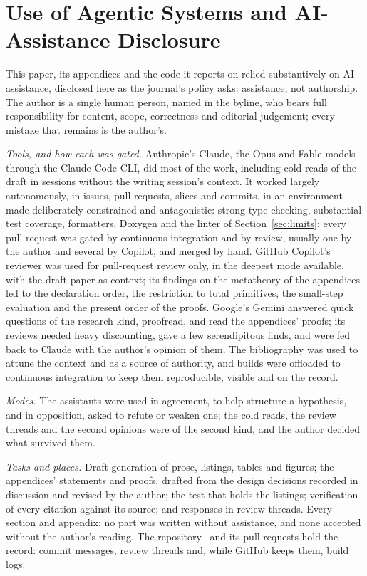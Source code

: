 \section*{Use of Agentic Systems and AI-Assistance Disclosure}

This paper, its appendices and the code it reports on relied substantively on AI assistance, disclosed here as the journal's policy asks: assistance, not authorship.
The author is a single human person, named in the byline, who bears full responsibility for content, scope, correctness and editorial judgement; every mistake that remains is the author's.

\emph{Tools, and how each was gated.}
Anthropic's Claude, the Opus and Fable models through the Claude Code CLI, did most of the work, including cold reads of the draft in sessions without the writing session's context.
It worked largely autonomously, in issues, pull requests, slices and commits, in an environment made deliberately constrained and antagonistic: strong type checking, substantial test coverage, formatters, Doxygen and the linter of Section~\ref{sec:limits}; every pull request was gated by continuous integration and by review, usually one by the author and several by Copilot, and merged by hand.
GitHub Copilot's reviewer was used for pull-request review only, in the deepest mode available, with the draft paper as context; its findings on the metatheory of the appendices led to the declaration order, the restriction to total primitives, the small-step evaluation and the present order of the proofs.
Google's Gemini answered quick questions of the research kind, proofread, and read the appendices' proofs; its reviews needed heavy discounting, gave a few serendipitous finds, and were fed back to Claude with the author's opinion of them.
The bibliography was used to attune the context and as a source of authority, and builds were offloaded to continuous integration to keep them reproducible, visible and on the record.

\emph{Modes.}
The assistants were used in agreement, to help structure a hypothesis, and in opposition, asked to refute or weaken one; the cold reads, the review threads and the second opinions were of the second kind, and the author decided what survived them.

\emph{Tasks and places.}
Draft generation of prose, listings, tables and figures; the appendices' statements and proofs, drafted from the design decisions recorded in discussion and revised by the author; the test that holds the listings; verification of every citation against its source; and responses in review threads.
Every section and appendix: no part was written without assistance, and none accepted without the author's reading.
The repository~\cite{Krautler_dedekind_2026} and its pull requests hold the record: commit messages, review threads and, while GitHub keeps them, build logs.

